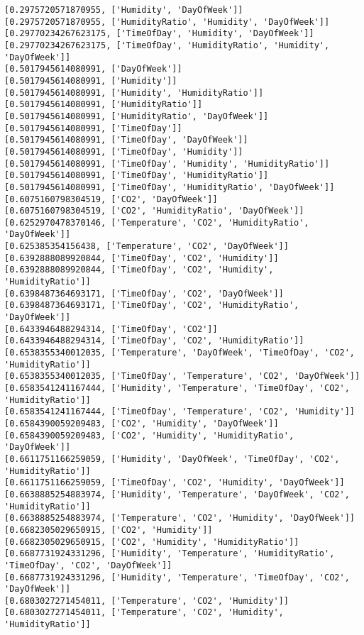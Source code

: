 \documentclass[11pt]{article}
\begin{document}
    \begin{Verbatim}[commandchars=\\\{\}]
[0.2975720571870955, ['Humidity', 'DayOfWeek']]
[0.2975720571870955, ['HumidityRatio', 'Humidity', 'DayOfWeek']]
[0.29770234267623175, ['TimeOfDay', 'Humidity', 'DayOfWeek']]
[0.29770234267623175, ['TimeOfDay', 'HumidityRatio', 'Humidity', 'DayOfWeek']]
[0.5017945614080991, ['DayOfWeek']]
[0.5017945614080991, ['Humidity']]
[0.5017945614080991, ['Humidity', 'HumidityRatio']]
[0.5017945614080991, ['HumidityRatio']]
[0.5017945614080991, ['HumidityRatio', 'DayOfWeek']]
[0.5017945614080991, ['TimeOfDay']]
[0.5017945614080991, ['TimeOfDay', 'DayOfWeek']]
[0.5017945614080991, ['TimeOfDay', 'Humidity']]
[0.5017945614080991, ['TimeOfDay', 'Humidity', 'HumidityRatio']]
[0.5017945614080991, ['TimeOfDay', 'HumidityRatio']]
[0.5017945614080991, ['TimeOfDay', 'HumidityRatio', 'DayOfWeek']]
[0.6075160798304519, ['CO2', 'DayOfWeek']]
[0.6075160798304519, ['CO2', 'HumidityRatio', 'DayOfWeek']]
[0.6252970478370146, ['Temperature', 'CO2', 'HumidityRatio', 'DayOfWeek']]
[0.625385354156438, ['Temperature', 'CO2', 'DayOfWeek']]
[0.6392888089920844, ['TimeOfDay', 'CO2', 'Humidity']]
[0.6392888089920844, ['TimeOfDay', 'CO2', 'Humidity', 'HumidityRatio']]
[0.6398487364693171, ['TimeOfDay', 'CO2', 'DayOfWeek']]
[0.6398487364693171, ['TimeOfDay', 'CO2', 'HumidityRatio', 'DayOfWeek']]
[0.6433946488294314, ['TimeOfDay', 'CO2']]
[0.6433946488294314, ['TimeOfDay', 'CO2', 'HumidityRatio']]
[0.6538355340012035, ['Temperature', 'DayOfWeek', 'TimeOfDay', 'CO2', 'HumidityRatio']]
[0.6538355340012035, ['TimeOfDay', 'Temperature', 'CO2', 'DayOfWeek']]
[0.6583541241167444, ['Humidity', 'Temperature', 'TimeOfDay', 'CO2', 'HumidityRatio']]
[0.6583541241167444, ['TimeOfDay', 'Temperature', 'CO2', 'Humidity']]
[0.6584390059209483, ['CO2', 'Humidity', 'DayOfWeek']]
[0.6584390059209483, ['CO2', 'Humidity', 'HumidityRatio', 'DayOfWeek']]
[0.6611751166259059, ['Humidity', 'DayOfWeek', 'TimeOfDay', 'CO2', 'HumidityRatio']]
[0.6611751166259059, ['TimeOfDay', 'CO2', 'Humidity', 'DayOfWeek']]
[0.6638885254883974, ['Humidity', 'Temperature', 'DayOfWeek', 'CO2', 'HumidityRatio']]
[0.6638885254883974, ['Temperature', 'CO2', 'Humidity', 'DayOfWeek']]
[0.6682305029650915, ['CO2', 'Humidity']]
[0.6682305029650915, ['CO2', 'Humidity', 'HumidityRatio']]
[0.6687731924331296, ['Humidity', 'Temperature', 'HumidityRatio', 'TimeOfDay', 'CO2', 'DayOfWeek']]
[0.6687731924331296, ['Humidity', 'Temperature', 'TimeOfDay', 'CO2', 'DayOfWeek']]
[0.6803027271454011, ['Temperature', 'CO2', 'Humidity']]
[0.6803027271454011, ['Temperature', 'CO2', 'Humidity', 'HumidityRatio']]

\end{Verbatim}
\end{document}
